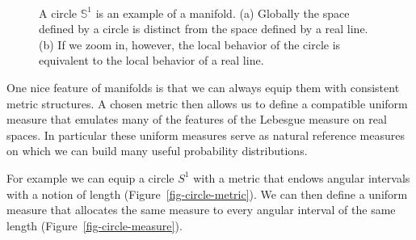 \documentclass[
  letterpaper,
  DIV=11,
  numbers=noendperiod]{scrartcl}
\begin{document}
\begin{figure}
\begin{minipage}[t]{0.80\linewidth}
{{}

}

\subcaption{\label{fig-circle-close}}
\end{minipage}%
%
\begin{minipage}[t]{0.10\linewidth}

{\centering 

~

}

\end{minipage}%

\caption{\label{fig-circle}A circle \(\mathbb{S}^{1}\) is an example of
a manifold. (a) Globally the space defined by a circle is distinct from
the space defined by a real line. (b) If we zoom in, however, the local
behavior of the circle is equivalent to the local behavior of a real
line.}

\end{figure}

One nice feature of manifolds is that we can always equip them with
consistent metric structures. A chosen metric then allows us to define a
compatible uniform measure that emulates many of the features of the
Lebesgue measure on real spaces. In particular these uniform measures
serve as natural reference measures on which we can build many useful
probability distributions.

For example we can equip a circle \(S^{1}\) with a metric that endows
angular intervals with a notion of length
(Figure~\ref{fig-circle-metric}). We can then define a uniform measure
that allocates the same measure to every angular interval of the same
length (Figure~\ref{fig-circle-measure}).
\end{document}
